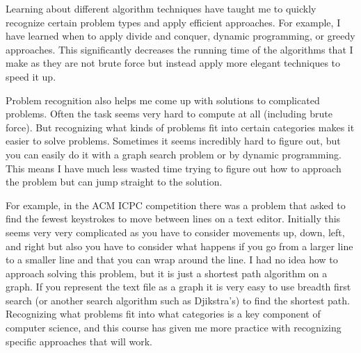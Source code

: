 \documentclass{article}
\begin{document}
Learning about different algorithm techniques have taught me to quickly recognize certain problem types and apply efficient approaches.
For example, I have learned when to apply divide and conquer, dynamic programming,
or greedy approaches. This significantly decreases the running time of the algorithms that I make as they are not brute force but instead apply more elegant techniques to speed it up.

Problem recognition also helps me come up with solutions to complicated problems.
Often the task seems very hard to compute at all (including brute force). But recognizing what kinds of problems fit into certain categories makes it easier to solve problems.
Sometimes it seems incredibly hard to figure out, but you can easily do it with a graph search problem or by dynamic programming.
This means I have much less wasted time trying to figure out how to approach the problem but can jump straight to the solution.

For example, in the ACM ICPC competition there was a problem that asked to find the fewest keystrokes to move between lines on a text editor.
Initially this seems very very complicated as you have to consider movements up,
down, left, and right but also you have to consider what happens if you go from a larger line to a smaller line and that you can wrap around the line.
I had no idea how to approach solving this problem, but it is just a shortest path algorithm on a graph.
If you represent the text file as a graph it is very easy to use breadth first search (or another search algorithm such as Djikstra's) to find the shortest path.
Recognizing what problems fit into what categories is a key component of computer science,
and this course has given me more practice with recognizing specific approaches that will work.
\end{document}
